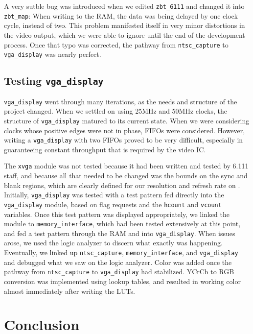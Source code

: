 \documentclass[10pt]{article}
\begin{document}
A very sutble bug was introduced when we edited {\tt zbt\_6111} and changed it into {\tt zbt\_map}: When writing to the RAM, the data was being delayed by one clock cycle, instead of two. This problem manifested itself in very minor distortions in the video output, which we were able to ignore until the end of the development process. Once that typo was corrected, the pathway from {\tt ntsc\_capture} to {\tt vga\_display} was nearly perfect.

\subsection{Testing {\tt vga\_display}}
{\tt vga\_display} went through many iterations, as the needs and structure of the project changed. When we settled on using 25MHz and 50MHz clocks, the structure of {\tt vga\_display} matured to its current state. When we were considering clocks whose positive edges were not in phase, FIFOs were considered. However, writing a {\tt vga\_display} with two FIFOs proved to be very difficult, especially in guaranteeing constant throughput that is required by the video IC.

The {\tt xvga} module was not tested because it had been written and tested by 6.111 staff, and because all that needed to be changed was the bounds on the sync and blank regions, which are clearly defined for our resolution and refresh rate on \cite{xvga}. Initially, {\tt vga\_display} was tested with a test pattern fed directly into the {\tt vga\_display} module, based on flag requests and the {\tt hcount} and {\tt vcount} variables. Once this test pattern was displayed appropriately, we linked the module to {\tt memory\_interface}, which had been tested extensively at this point, and fed a test pattern through the RAM and into {\tt vga\_display}. When issues arose, we used the logic analyzer to discern what exactly was happening. Eventually, we linked up {\tt ntsc\_capture}, {\tt memory\_interface}, and {\tt vga\_display} and debugged what we saw on the logic analyzer. Color was added once the pathway from {\tt ntsc\_capture} to {\tt vga\_display} had stabilized. YCrCb to RGB conversion was implemented using lookup tables, and resulted in working color almost immediately after writing the LUTs.

\section{Conclusion}
\end{document}
